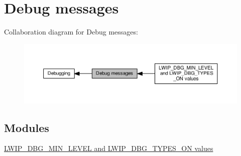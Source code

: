 \hypertarget{group__lwip__opts__debugmsg}{}\section{Debug messages}
\label{group__lwip__opts__debugmsg}
Collaboration diagram for Debug messages\+:
\nopagebreak
\begin{figure}[H]
\begin{center}
\leavevmode
\includegraphics[width=350pt]{group__lwip__opts__debugmsg}
\end{center}
\end{figure}
\subsection*{Modules}
\begin{DoxyCompactItemize}
\item 
\hyperlink{group__debugging__levels}{L\+W\+I\+P\+\_\+\+D\+B\+G\+\_\+\+M\+I\+N\+\_\+\+L\+E\+V\+E\+L and L\+W\+I\+P\+\_\+\+D\+B\+G\+\_\+\+T\+Y\+P\+E\+S\+\_\+\+O\+N values}
\end{DoxyCompactItemize}
